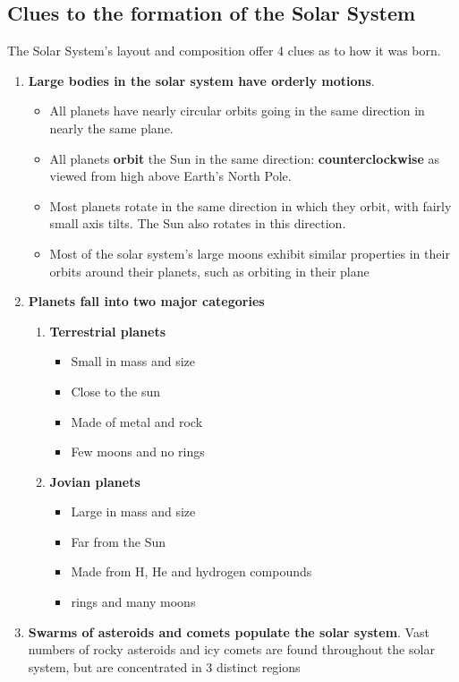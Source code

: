 \documentclass[12pt]{article}
\begin{document}
\subsection{Clues to the formation of the Solar System}
The Solar System's layout and composition offer 4 clues as to how it was born.
\begin{enumerate}
\item {\bf Large bodies in the solar system have orderly motions}.
\begin{itemize}
\item All planets have nearly circular orbits going in the same direction in nearly the same plane.
\item  All planets {\bf orbit} the Sun in the same direction: {\bf counterclockwise} as viewed from high above Earth’s North Pole.
\item Most planets rotate in the same direction in which they orbit, with fairly small axis tilts. The Sun also rotates in this direction.
\item Most of the solar system’s large moons exhibit similar properties in their orbits around their planets, such as orbiting in their plane
\end{itemize}
\item {\bf Planets fall into two major categories}
\begin{enumerate}
\item {\bf Terrestrial planets}
\begin{itemize}
\item Small in mass and size
\item Close to the sun
\item Made of metal and rock
\item Few moons and no rings
\end{itemize}
\item {\bf Jovian planets}
\begin{itemize}
\item Large in mass and size
\item Far from the Sun
\item Made from H, He and hydrogen compounds
\item rings and many moons
\end{itemize}
\end{enumerate}
\item {\bf Swarms of asteroids and comets populate the solar system}. Vast numbers of rocky asteroids and icy comets are found throughout the solar system, but are concentrated in 3 distinct regions
\begin{itemize}

\end{itemize}
\end{enumerate}
\end{document}
